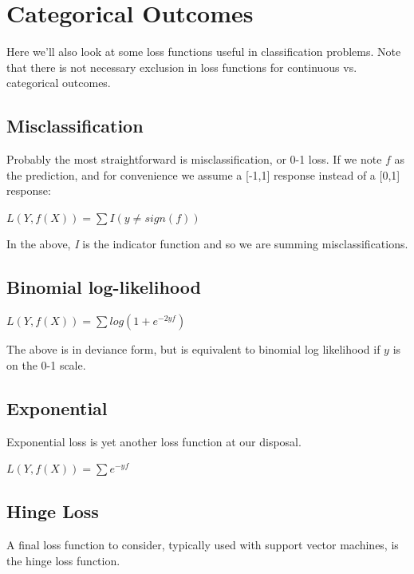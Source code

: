 \documentclass[english,nohyper,titlepage]{tufte-handout}\usepackage{knitr}
\begin{document}
\section{Categorical Outcomes}
Here we'll also look at some loss functions useful in classification problems. Note that there is not necessary exclusion in loss functions for continuous vs. categorical outcomes.

\subsection{Misclassification}
Probably the most straightforward is misclassification, or 0-1 loss.  If we note $f$ as the prediction, and for convenience we assume a [-1,1] response instead of a [0,1] response:

\vspace{.25cm}
\noindent$L(Y, f(X)) = \sum I(y\neq sign(f))$
\vspace{.25cm}

In the above, \emph{I} is the indicator function and so we are summing misclassifications.


\subsection{Binomial log-likelihood}

\vspace{.25cm}
\noindent$L(Y, f(X)) = \sum log(1 + e^{-2yf})$
\vspace{.25cm}

The above is in deviance form, but is equivalent to binomial log likelihood if $y$ is on the 0-1 scale.

\subsection{Exponential}
Exponential loss is yet another loss function at our disposal.

\vspace{.25cm}
\noindent$L(Y, f(X)) = \sum e^{-yf}$
\vspace{.25cm}

\subsection{Hinge Loss}
A final loss function to consider, typically used with support vector machines, is the hinge loss function.
\end{document}
